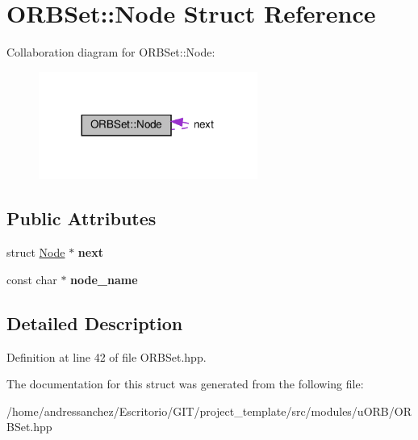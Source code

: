 \hypertarget{structORBSet_1_1Node}{}\section{O\+R\+B\+Set\+:\+:Node Struct Reference}
\label{structORBSet_1_1Node}


Collaboration diagram for O\+R\+B\+Set\+:\+:Node\+:\nopagebreak
\begin{figure}[H]
\begin{center}
\leavevmode
\includegraphics[width=203pt]{df/dc1/structORBSet_1_1Node__coll__graph}
\end{center}
\end{figure}
\subsection*{Public Attributes}
\begin{DoxyCompactItemize}
\item 
\mbox{\label{structORBSet_1_1Node_a30880197d04672d02efd8e1b840e0d9d}} 
struct \hyperlink{structORBSet_1_1Node}{Node} $\ast$ {\bfseries next}
\item 
\mbox{\label{structORBSet_1_1Node_aae0249065130dcbb2f1b785dfc06751b}} 
const char $\ast$ {\bfseries node\+\_\+name}
\end{DoxyCompactItemize}


\subsection{Detailed Description}


Definition at line 42 of file O\+R\+B\+Set.\+hpp.



The documentation for this struct was generated from the following file\+:\begin{DoxyCompactItemize}
\item 
/home/andressanchez/\+Escritorio/\+G\+I\+T/project\+\_\+template/src/modules/u\+O\+R\+B/O\+R\+B\+Set.\+hpp\end{DoxyCompactItemize}
